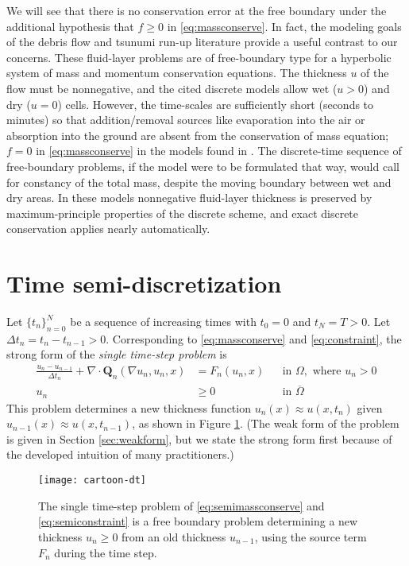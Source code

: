 \documentclass[final,onefignum]{siamart190516}
\newcommand\bQ{\mathbf{Q}}
\newcommand{\Div}{\nabla\cdot}
\newcommand{\grad}{\nabla}
\begin{document}
We will see that there is no conservation error at the free boundary under the additional hypothesis that $f\ge 0$ in \eqref{eq:massconserve}.  In fact, the modeling goals of the debris flow \cite{GeorgeIverson2014} and tsunumi run-up \cite{LeVequeetal2011} literature provide a useful contrast to our concerns.  These fluid-layer problems are of free-boundary type for a hyperbolic system of mass and momentum conservation equations.  The thickness $u$ of the flow must be nonnegative, and the cited discrete models allow wet ($u>0$) and dry ($u=0$) cells.  However, the time-scales are sufficiently short (seconds to minutes) so that addition/removal sources like evaporation into the air or absorption into the ground are absent from the conservation of mass equation; $f=0$ in \eqref{eq:massconserve} in the models found in \cite{GeorgeIverson2014,LeVequeetal2011}.  The discrete-time sequence of free-boundary problems, if the model were to be formulated that way, would call for constancy of the total mass, despite the moving boundary between wet and dry areas.  In these models nonnegative fluid-layer thickness is preserved by maximum-principle properties of the discrete scheme, and exact discrete conservation applies nearly automatically.


\section{Time semi-discretization}  \label{sec:strongform}

Let $\{t_n\}_{n=0}^N$ be a sequence of increasing times with $t_0=0$ and $t_N=T>0$.  Let $\Delta t_n = t_n-t_{n-1}>0$.  Corresponding to \eqref{eq:massconserve} and \eqref{eq:constraint}, the strong form of the \emph{single time-step problem} is
\begin{align}
\frac{u_n - u_{n-1}}{\Delta t_n} + \Div \bQ_n(\grad u_n,u_n,x) &= F_n(u_n,x) &&\text{in } \Omega, \text{ where } u_n > 0 \label{eq:semimassconserve} \\
u_n &\ge 0 &&\text{in } \overline{\Omega} \label{eq:semiconstraint}
\end{align}
This problem determines a new thickness function $u_n(x) \approx u(x,t_n)$ given $u_{n-1}(x) \approx u(x,t_{n-1})$, as shown in Figure \ref{fig:timestepcartoon}.  (The weak form of the problem is given in Section \ref{sec:weakform}, but we state the strong form first because of the developed intuition of many practitioners.)

\begin{figure}[ht]
\begin{center}
\texttt{[image: cartoon-dt]}
\end{center}
\caption{The single time-step problem of \eqref{eq:semimassconserve} and \eqref{eq:semiconstraint} is a free boundary problem determining a new thickness $u_n\ge 0$ from an old thickness $u_{n-1}$, using the source term $F_n$ during the time step.}
\label{fig:timestepcartoon}
\end{figure}
\end{document}
